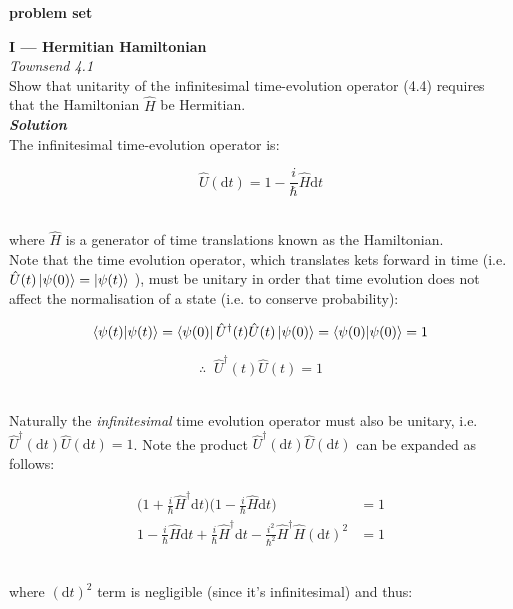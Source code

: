 \documentclass[9pt]{extarticle}
\newcommand{\bfit}[1]{\textbf{\textit{#1}}}
\renewcommand{\d}{\text{d}}
\begin{document}
\setlength{\parindent}{0pt}





{\huge \bf problem set} 

\noindent \hrulefill

\begin{multicols*}{2}





{\bf \LARGE I --- Hermitian Hamiltonian} \\

{\it Townsend 4.1} \\ 
Show that unitarity of the infinitesimal time-evolution operator (4.4) requires that the Hamiltonian $\hat H$ be Hermitian. \\ 

{\bfit{Solution}} \\ 
The infinitesimal time-evolution operator is:

$$\hat U (\d t) = 1 - \frac i \hbar \hat H \d t$$ \ 

where $\hat H$ is a generator of time translations known as the Hamiltonian. \\ 

Note that the time evolution operator, which translates kets forward in time (i.e. $\hat U(t) \ket{\psi(0)} = \ket{\psi(t)}$ ), must be unitary in order that time evolution does not affect the normalisation of a state (i.e. to conserve probability):

$$\bra{\psi(t)}\ket{\psi(t)} = \bra{\psi(0)} \hat U^\dagger(t) \hat U(t) \ket{\psi(0)} = \bra{\psi(0)}\ket{\psi(0)} = 1$$ 

$$\therefore \;\; \hat U^\dagger (t) \hat U (t) = 1$$ \

Naturally the {\it infinitesimal} time evolution operator must also be unitary, i.e. $\hat U^\dagger (\d t) \hat U (\d t) = 1$. Note the product $\hat U^\dagger (\d t) \hat U (\d t)$ can be expanded as follows:  

$$
\begin{aligned}
	\bigg( 1 + \frac i \hbar \hat H^\dagger \d t \bigg) \bigg( 1 - \frac i \hbar \hat H \d t \bigg) &= 1 \\ 
	1 - \frac i \hbar \hat H \d t + \frac i \hbar \hat H^\dagger \d t - \frac{i^2}{\hbar^2} \hat H^\dagger \hat H (\d t)^2 &= 1
\end{aligned}
$$ \ 

where $(\d t)^2$ term is negligible (since it's infinitesimal) and thus:


\end{multicols*}
\end{document}
